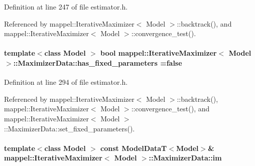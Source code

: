 Definition at line 247 of file estimator.\+h.



Referenced by mappel\+::\+Iterative\+Maximizer$<$ Model $>$\+::backtrack(), and mappel\+::\+Iterative\+Maximizer$<$ Model $>$\+::convergence\+\_\+test().

\paragraph[{\texorpdfstring{has\+\_\+fixed\+\_\+parameters}{has_fixed_parameters}}]{\setlength{\rightskip}{0pt plus 5cm}template$<$class Model $>$ bool {\bf mappel\+::\+Iterative\+Maximizer}$<$ Model $>$\+::Maximizer\+Data\+::has\+\_\+fixed\+\_\+parameters =false}\hypertarget{classmappel_1_1IterativeMaximizer_1_1MaximizerData_a9f1c22b2c3065f92244230a74fc948aa}{}\label{classmappel_1_1IterativeMaximizer_1_1MaximizerData_a9f1c22b2c3065f92244230a74fc948aa}


Definition at line 294 of file estimator.\+h.



Referenced by mappel\+::\+Iterative\+Maximizer$<$ Model $>$\+::backtrack(), mappel\+::\+Iterative\+Maximizer$<$ Model $>$\+::convergence\+\_\+test(), and mappel\+::\+Iterative\+Maximizer$<$ Model $>$\+::\+Maximizer\+Data\+::set\+\_\+fixed\+\_\+parameters().

\paragraph[{\texorpdfstring{im}{im}}]{\setlength{\rightskip}{0pt plus 5cm}template$<$class Model $>$ const {\bf Model\+DataT}$<$Model$>$\& {\bf mappel\+::\+Iterative\+Maximizer}$<$ Model $>$\+::Maximizer\+Data\+::im}\hypertarget{classmappel_1_1IterativeMaximizer_1_1MaximizerData_afcee3fa283be1a9ba1d197ed777d447c}{}\label{classmappel_1_1IterativeMaximizer_1_1MaximizerData_afcee3fa283be1a9ba1d197ed777d447c}


